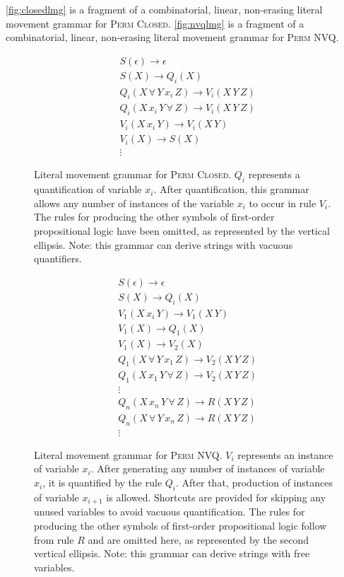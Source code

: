 \documentclass{article}
\theoremstyle{remark} \newtheorem{technicality}{Technical note}
\theoremstyle{definition} \newtheorem{definition}{Definition}
\theoremstyle{definition} \newtheorem{openproblem}{Open problem}
\newcommand{\pc}{\textsc{Perm Closed}}
\newcommand{\pn}{\textsc{Perm NVQ}}
\begin{document}
\autoref{fig:closedlmg} is a fragment of a combinatorial, linear, non-erasing literal movement grammar for \pc.
\autoref{fig:nvqlmg} is a fragment of a combinatorial, linear, non-erasing literal movement grammar for \pn.

\begin{figure}
  \caption{
    \label{fig:closedlmg}
    Literal movement grammar for \pc.
    $Q_i$ represents a quantification of variable $x_i$.
    After quantification, this grammar allows any number of instances of the variable $x_i$ to occur in rule $V_i$.
    The rules for producing the other symbols of first-order propositional logic have been omitted, as represented by the vertical ellipsis.
    Note: this grammar can derive strings with vacuous quantifiers.
  }
  \begin{align*}
    & S(\epsilon) \rightarrow \epsilon \\
    & S(X) \rightarrow Q_i(X) \\
    & Q_i(X \, \forall \, Y \, x_i \, Z) \rightarrow V_i(X \, Y \, Z) \\
    & Q_i(X \, x_i \, Y \, \forall \, Z) \rightarrow V_i(X\, Y \, Z) \\
    & V_i(X \, x_i \, Y) \rightarrow V_i(X \, Y) \\
    & V_i(X) \rightarrow S(X) \\
    & \vdots
  \end{align*}
\end{figure}

\begin{figure}
  \caption{
    \label{fig:nvqlmg}
    Literal movement grammar for \pn.
    $V_i$ represents an instance of variable $x_i$.
    After generating any number of instances of variable $x_i$, it is quantified by the rule $Q_i$.
    After that, production of instances of variable $x_{i+1}$ is allowed.
    Shortcuts are provided for skipping any unused variables to avoid vacuous quantification.
    The rules for producing the other symbols of first-order propositional logic follow from rule $R$ and are omitted here, as represented by the second vertical ellipsis.
    Note: this grammar can derive strings with free variables.
  }
  \begin{align*}
    & S(\epsilon) \rightarrow \epsilon \\
    & S(X) \rightarrow Q_i(X) \\
    & V_1(X \, x_i \, Y) \rightarrow V_1(X \, Y) \\
    & V_1(X) \rightarrow Q_1(X) \\
    & V_1(X) \rightarrow V_2(X) \\
    & Q_1(X \, \forall \, Y \, x_1 \, Z) \rightarrow V_2(X \, Y \, Z) \\
    & Q_1(X \, x_1 \, Y \, \forall \, Z) \rightarrow V_2(X \, Y \, Z) \\
    & \vdots \\
    & Q_n(X \, x_n \, Y \, \forall \, Z) \rightarrow R(X \, Y \, Z) \\
    & Q_n(X \, \forall \,  Y \, x_n \, Z) \rightarrow R(X \, Y \, Z) \\
    & \vdots
  \end{align*}
\end{figure}
\end{document}
